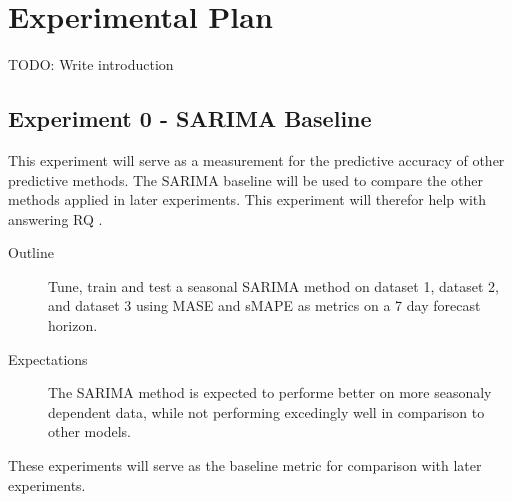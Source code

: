 
\section{Experimental Plan}
\label{section:Results:ExperimentalPlan}
TODO: Write introduction

\iffalse
  Trying and failing is a major part of research.
  However, to have a chance of success you need a plan driving the experimental research,
  just as you need a plan for your literature search.
  Further, plans are made to be revised and this revision ensures that any further decisions made are in line with the work already completed.

  The plan should include what experiments or series of experiments are planned and what question the individual or set of experiments aim to answer.
  Such questions should be connected to your research questions so that in the evaluation of your results you can discuss the results wrt to the research questions.
\fi


\subsection{Experiment 0 - SARIMA Baseline}
\label{section:results:experimentPlan:Experiment-0}
This experiment will serve as a measurement for the predictive accuracy of other predictive methods.
The SARIMA baseline will be used to compare the other methods applied in later experiments.
This experiment will therefor help with answering RQ .

\begin{description}
  \item[Outline]{
              Tune, train and test a seasonal SARIMA method on dataset 1, dataset 2,
              and dataset 3 using MASE and sMAPE as metrics on a 7 day forecast horizon.
        }
\end{description}

\begin{description}
  \item[Expectations]{
              The SARIMA method is expected to performe better on more seasonaly dependent data,
              while not performing excedingly well in comparison to other models.
        }
\end{description}

These experiments will serve as the baseline metric for comparison with later experiments.




